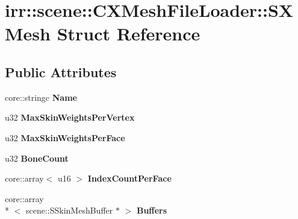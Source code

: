 \hypertarget{structirr_1_1scene_1_1_c_x_mesh_file_loader_1_1_s_x_mesh}{\section{irr\-:\-:scene\-:\-:C\-X\-Mesh\-File\-Loader\-:\-:S\-X\-Mesh Struct Reference}
\label{structirr_1_1scene_1_1_c_x_mesh_file_loader_1_1_s_x_mesh}
}
\subsection*{Public Attributes}
\begin{DoxyCompactItemize}
\item 
\hypertarget{structirr_1_1scene_1_1_c_x_mesh_file_loader_1_1_s_x_mesh_a1e5d16a5b797118cfebe3c2bfa1b8a1f}{core\-::stringc {\bfseries Name}}\label{structirr_1_1scene_1_1_c_x_mesh_file_loader_1_1_s_x_mesh_a1e5d16a5b797118cfebe3c2bfa1b8a1f}

\item 
\hypertarget{structirr_1_1scene_1_1_c_x_mesh_file_loader_1_1_s_x_mesh_afb7efe32968b5670f7c3e8b4bc235e4f}{u32 {\bfseries Max\-Skin\-Weights\-Per\-Vertex}}\label{structirr_1_1scene_1_1_c_x_mesh_file_loader_1_1_s_x_mesh_afb7efe32968b5670f7c3e8b4bc235e4f}

\item 
\hypertarget{structirr_1_1scene_1_1_c_x_mesh_file_loader_1_1_s_x_mesh_a496d9470a6c88249092bcdbd762cb094}{u32 {\bfseries Max\-Skin\-Weights\-Per\-Face}}\label{structirr_1_1scene_1_1_c_x_mesh_file_loader_1_1_s_x_mesh_a496d9470a6c88249092bcdbd762cb094}

\item 
\hypertarget{structirr_1_1scene_1_1_c_x_mesh_file_loader_1_1_s_x_mesh_a85ae26058c95f5cba2fab0822d7cd6f5}{u32 {\bfseries Bone\-Count}}\label{structirr_1_1scene_1_1_c_x_mesh_file_loader_1_1_s_x_mesh_a85ae26058c95f5cba2fab0822d7cd6f5}

\item 
\hypertarget{structirr_1_1scene_1_1_c_x_mesh_file_loader_1_1_s_x_mesh_abbb4d738e3fe7f9f0540fde9fd26e444}{core\-::array$<$ u16 $>$ {\bfseries Index\-Count\-Per\-Face}}\label{structirr_1_1scene_1_1_c_x_mesh_file_loader_1_1_s_x_mesh_abbb4d738e3fe7f9f0540fde9fd26e444}

\item 
\hypertarget{structirr_1_1scene_1_1_c_x_mesh_file_loader_1_1_s_x_mesh_a408b92ee62e9fa8549706834723b5282}{core\-::array\\*
$<$ scene\-::\-S\-Skin\-Mesh\-Buffer $\ast$ $>$ {\bfseries Buffers}}\label{structirr_1_1scene_1_1_c_x_mesh_file_loader_1_1_s_x_mesh_a408b92ee62e9fa8549706834723b5282}


\end{DoxyCompactItemize}
